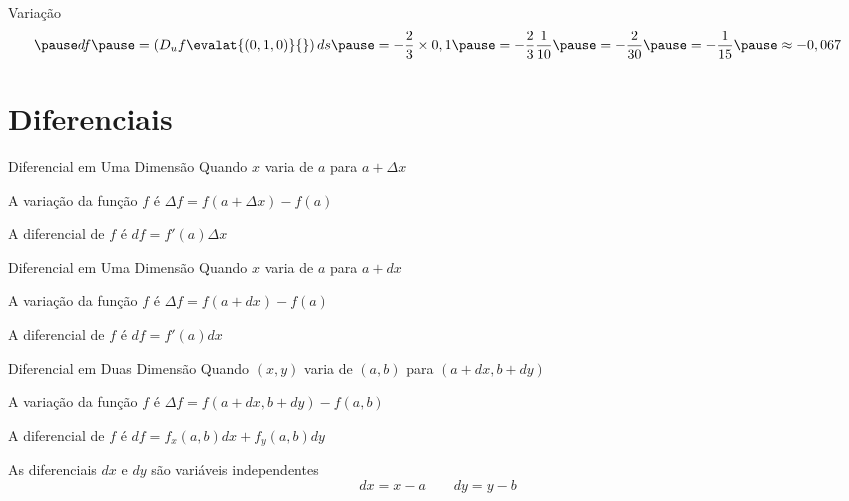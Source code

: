 \documentclass[fleqn,utf8,aspectratio=169,12pt]{beamer}
\begin{document}
\begin{resolution}{Variação}
  \[
    \pause
    df
    \pause
    = \left(D_u f\evalat{(0, 1, 0)}{}\right) ds
    \pause
    = -\frac{2}{3}\times 0,1
    \pause
    = -\frac{2}{3} \frac{1}{10}
    \pause
    = -\frac{2}{30}
    \pause
    = -\frac{1}{15}
    \pause
    \approx -0,067
  \]
\end{resolution}

\section{Diferenciais}

\begin{frame}{Diferencial em Uma Dimensão}
  Quando $x$ varia de $a$ para
  \tabto{55mm}\(a+\Delta x\)

  \pause
  \vspace{\baselineskip}
  A variação da função $f$ é
  \tabto{55mm}\(\Delta f = f(a + \Delta x) - f(a)\)

  \pause
  \vspace{\baselineskip}
  A diferencial de $f$ é
  \tabto{55mm}\(df = f'(a) \Delta x\)
\end{frame}

\begin{frame}{Diferencial em Uma Dimensão}
  Quando $x$ varia de $a$ para
  \tabto{55mm}\(a+dx\)

  \vspace{\baselineskip}
  A variação da função $f$ é
  \tabto{55mm}\(\Delta f = f(a + dx) - f(a)\)

  \vspace{\baselineskip}
  A diferencial de $f$ é
  \tabto{55mm}\(df = f'(a) dx\)
\end{frame}

\begin{frame}{Diferencial em Duas Dimensão}
  Quando $(x, y)$ varia de $(a, b)$ para
  \tabto{65mm}\((a+dx, b+dy)\)

  \pause
  \vspace{\baselineskip}
  A variação da função $f$ é
  \tabto{65mm}\(\Delta f = f(a+dx, b+dy) - f(a, b)\)

  \pause
  \vspace{\baselineskip}
  A diferencial de $f$ é
  \tabto{65mm}\(df = f_x(a, b) dx +  f_y(a, b) dy\)

  \pause
  \vspace{\baselineskip}
  As diferenciais $dx$ e $dy$ são variáveis independentes
  \[
    dx = x - a
    \qquad
    dy=y-b
  \]
\end{frame}
\end{document}
